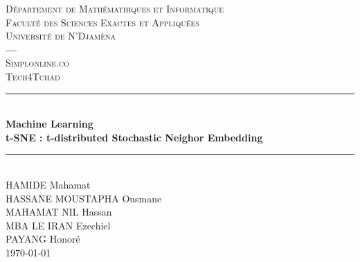 \documentclass[12pt,a4paper]{report}
\begin{document}
	\begin{titlepage}
		\newcommand{\HRule}{\rule{\linewidth}{0.5mm}}
		\center
		\textsc{\large
			Département de Mathémathiques et Informatique \\[0.25cm]
			Faculté des Sciences Exactes et Appliquées \\[0.25cm]
			Université de N'Djamèna \\[0.25cm]
			\centering \textbf{---}\\[0.25cm]
			Simplonline.co \\[0.25cm] Tech4Tchad 
		} \\[1.5cm]
		\HRule \\[0.15cm]
		{ %
			\bfseries Machine Learning \\ t-SNE : t-distributed Stochastic Neighor Embedding \\[0.15cm] }
		\HRule \\[1.5cm]
		HAMIDE Mahamat \\
		HASSANE MOUSTAPHA Ousmane \\
		MAHAMAT NIL Hassan \\
		MBA LE IRAN Ezechiel \\
		PAYANG Honoré
		\\[1.5cm]
		\today \\ [1cm]
	\end{titlepage}
\end{document}
